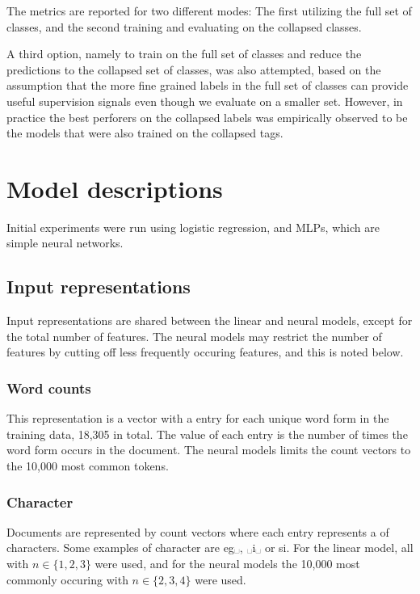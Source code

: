 The metrics are reported for two different modes: The first utilizing the
full set of classes, and the second training and evaluating on the collapsed
classes.

A third option, namely to train on the full set of classes and reduce the
predictions to the collapsed set of classes, was also attempted, based on the
assumption that the more fine grained labels in the full set of classes can
provide useful supervision signals even though we evaluate on a smaller set.
However, in practice the best perforers on the collapsed labels was
empirically observed to be the models that were also trained on the collapsed
tags.


\section{Model descriptions}

Initial experiments were run using logistic regression, and \acp{MLP}, which
are simple neural networks.

\subsection{Input representations}

Input representations are shared between the linear and neural models, except
for the total number of features. The neural models may restrict the number
of features by cutting off less frequently occuring features, and this is
noted below.

\subsubsection*{Word counts}

This representation is a vector with a entry for each unique word form in the
training data, 18,305 in total. The value of each entry is the number of
times the word form occurs in the document. The neural models limits the
count vectors to the 10,000 most common tokens.

\subsubsection*{Character \ngrams}

Documents are represented by count vectors where each entry represents a
\ngram of characters. Some examples of character \ngrams are \textlangle
eg␣\textrangle, \textlangle␣i␣\textrangle\xspace or \textlangle si\textrangle. For
the linear model, all \ngrams with $n\in \{1,2,3\}$ were used, and for the
neural models the 10,000 most commonly occuring \ngrams with $n\in \{2,3,4\}$
were used.

